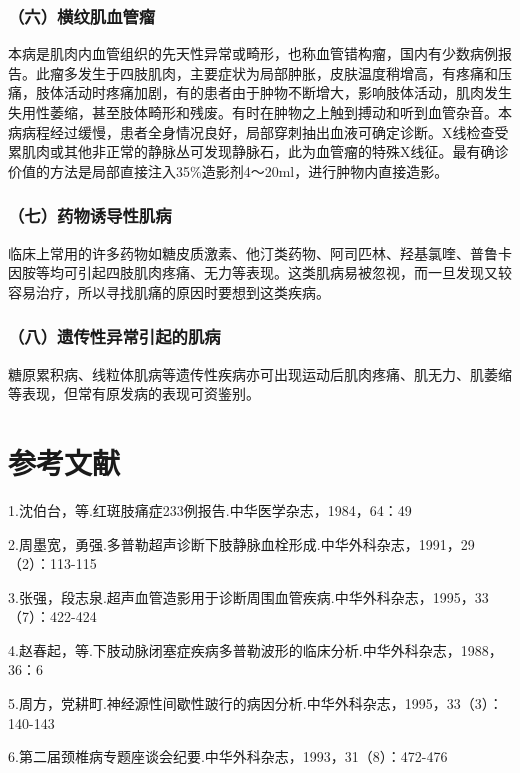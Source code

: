 \subsubsection{（六）横纹肌血管瘤}

本病是肌肉内血管组织的先天性异常或畸形，也称血管错构瘤，国内有少数病例报告。此瘤多发生于四肢肌肉，主要症状为局部肿胀，皮肤温度稍增高，有疼痛和压痛，肢体活动时疼痛加剧，有的患者由于肿物不断增大，影响肢体活动，肌肉发生失用性萎缩，甚至肢体畸形和残废。有时在肿物之上触到搏动和听到血管杂音。本病病程经过缓慢，患者全身情况良好，局部穿刺抽出血液可确定诊断。X线检查受累肌肉或其他非正常的静脉丛可发现静脉石，此为血管瘤的特殊X线征。最有确诊价值的方法是局部直接注入35\%造影剂4～20ml，进行肿物内直接造影。

\subsubsection{（七）药物诱导性肌病}

临床上常用的许多药物如糖皮质激素、他汀类药物、阿司匹林、羟基氯喹、普鲁卡因胺等均可引起四肢肌肉疼痛、无力等表现。这类肌病易被忽视，而一旦发现又较容易治疗，所以寻找肌痛的原因时要想到这类疾病。

\subsubsection{（八）遗传性异常引起的肌病}

糖原累积病、线粒体肌病等遗传性疾病亦可出现运动后肌肉疼痛、肌无力、肌萎缩等表现，但常有原发病的表现可资鉴别。

\protect\hypertarget{text00345.html}{}{}

\section{参考文献}

1.沈伯台，等.红斑肢痛症233例报告.中华医学杂志，1984，64：49

2.周墨宽，勇强.多普勒超声诊断下肢静脉血栓形成.中华外科杂志，1991，29（2）：113-115

3.张强，段志泉.超声血管造影用于诊断周围血管疾病.中华外科杂志，1995，33（7）：422-424

4.赵春起，等.下肢动脉闭塞症疾病多普勒波形的临床分析.中华外科杂志，1988，36：6

5.周方，党耕町.神经源性间歇性跛行的病因分析.中华外科杂志，1995，33（3）：140-143

6.第二届颈椎病专题座谈会纪要.中华外科杂志，1993，31（8）：472-476

